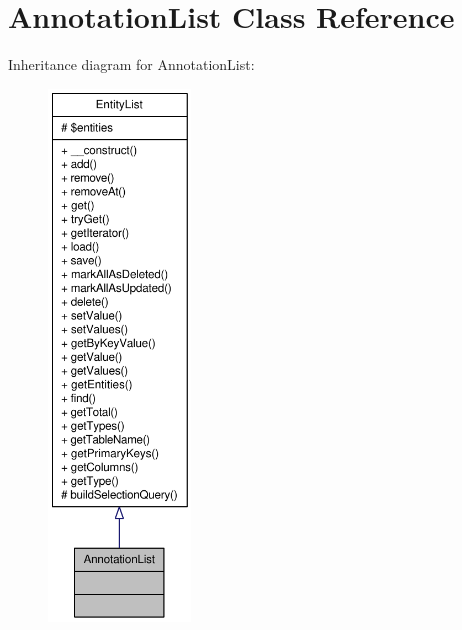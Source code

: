 \hypertarget{classAnnotationList}{
\section{AnnotationList Class Reference}
\label{classAnnotationList}
}


Inheritance diagram for AnnotationList:\nopagebreak
\begin{figure}[H]
\begin{center}
\leavevmode
\includegraphics[height=400pt]{classAnnotationList__inherit__graph}
\end{center}
\end{figure}


